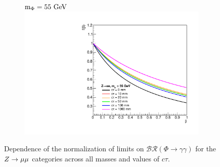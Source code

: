 \begin{figure}[htb!]
\begin{subfigure}{0.3\linewidth}
	\end{subfigure}
	\begin{subfigure}{0.3\linewidth}
		\centering
		$\mphi=55\unit{GeV}$
		\includegraphics[width=\linewidth]{figs/05_analysis/BR_Z_ELE_55.pdf}
	\end{subfigure}
	\caption[Dependence of the normalization of limits on $\mathcal{BR}(\Phi\to\gamma\gamma)$ for the $\VZ\to ee$ categories across all masses and values of $c\tau$.]{Dependence of the normalization of limits on $\mathcal{BR}(\Phi\to\gamma\gamma)$ for the $\VZ\to\mu\mu$ categories across all masses and values of $c\tau$.}
	\label{fig:BR_ELE}
\end{figure}

